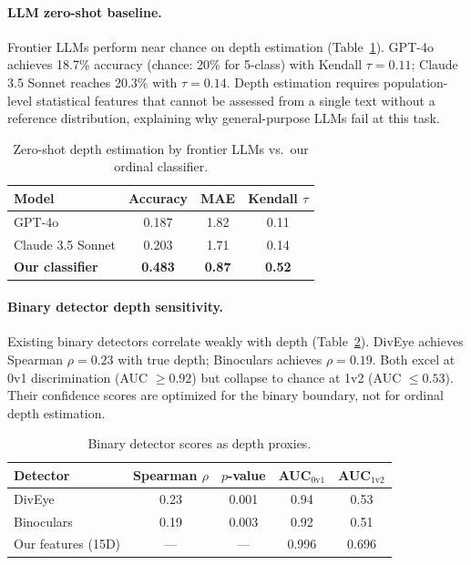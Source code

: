 \documentclass[11pt,a4paper]{article}
\begin{document}
\paragraph{LLM zero-shot baseline.}
Frontier LLMs perform near chance on depth estimation (Table~\ref{tab:llm}). GPT-4o achieves 18.7\% accuracy (chance: 20\% for 5-class) with Kendall $\tau{=}0.11$; Claude 3.5 Sonnet reaches 20.3\% with $\tau{=}0.14$. Depth estimation requires population-level statistical features that cannot be assessed from a single text without a reference distribution, explaining why general-purpose LLMs fail at this task.

\begin{table}[t]
\centering
\small
\caption{Zero-shot depth estimation by frontier LLMs vs.\ our ordinal classifier.}
\label{tab:llm}
\begin{tabular}{@{}lccc@{}}
\toprule
\textbf{Model} & \textbf{Accuracy} & \textbf{MAE} & \textbf{Kendall $\tau$} \\
\midrule
GPT-4o & 0.187 & 1.82 & 0.11 \\
Claude 3.5 Sonnet & 0.203 & 1.71 & 0.14 \\
\textbf{Our classifier} & \textbf{0.483} & \textbf{0.87} & \textbf{0.52} \\
\bottomrule
\end{tabular}
\end{table}

\paragraph{Binary detector depth sensitivity.}
\label{sec:binary_baseline}
Existing binary detectors correlate weakly with depth (Table~\ref{tab:binary}). DivEye achieves Spearman $\rho{=}0.23$ with true depth; Binoculars achieves $\rho{=}0.19$. Both excel at 0v1 discrimination (AUC $\geq 0.92$) but collapse to chance at 1v2 (AUC $\leq 0.53$). Their confidence scores are optimized for the binary boundary, not for ordinal depth estimation.

\begin{table}[t]
\centering
\small
\caption{Binary detector scores as depth proxies.}
\label{tab:binary}
\begin{tabular}{@{}lcccc@{}}
\toprule
\textbf{Detector} & \textbf{Spearman $\rho$} & \textbf{$p$-value} & \textbf{AUC$_{0\text{v}1}$} & \textbf{AUC$_{1\text{v}2}$} \\
\midrule
DivEye & 0.23 & 0.001 & 0.94 & 0.53 \\
Binoculars & 0.19 & 0.003 & 0.92 & 0.51 \\
Our features (15D) & --- & --- & 0.996 & 0.696 \\
\bottomrule
\end{tabular}
\end{table}
\end{document}
